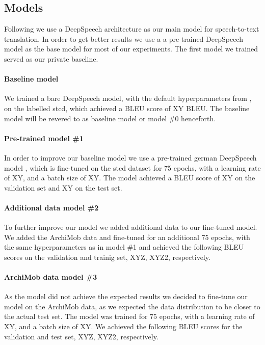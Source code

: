 \subsection{Models}
Following  we use a DeepSpeech architecture \cite{Hannun2014DeepSS} as our main model for speech-to-text translation. In order to get better results we use a
a pre-trained DeepSpeech model \cite{DeepSpeechGerman090} as the base model for most of our experiments. The first model we trained served as our private baseline. \paragraph{Baseline model} We trained a bare DeepSpeech model,
with the default hyperparameters from ,
on the labelled \gls{stcd}, which achieved a BLEU score of XY BLEU. The baseline model will be revered to as baseline model or model \#0 henceforth.\paragraph{Pre-trained model \#1} In order to improve our baseline model we use a pre-trained
german DeepSpeech model \cite{DeepSpeechGerman090}, which is fine-tuned on the \gls{stcd} dataset for 75 epochs, with a learning rate of XY, and a batch size of XY. The model achieved a BLEU score of
XY on the validation set and XY on the test set.
\paragraph{Additional data model \#2} To further improve our  model we added additional data to our fine-tuned model. We added the ArchiMob data and fine-tuned for an additional 75 epochs, with
the same hyperparameters as in model \#1 and achieved the following BLEU scores on the validation and trainig set, XYZ, XYZ2, respectively.
\paragraph{ArchiMob data model \#3} As the  model did not achieve the expected results we decided to fine-tune our model on the ArchiMob data, as we expected the data distribution to be closer
to the actual test set. The model was trained for 75 epochs, with a learning rate of XY, and a batch size of XY. We achieved the following BLEU scores for the validation and test set, XYZ, XYZ2,
respectively.
